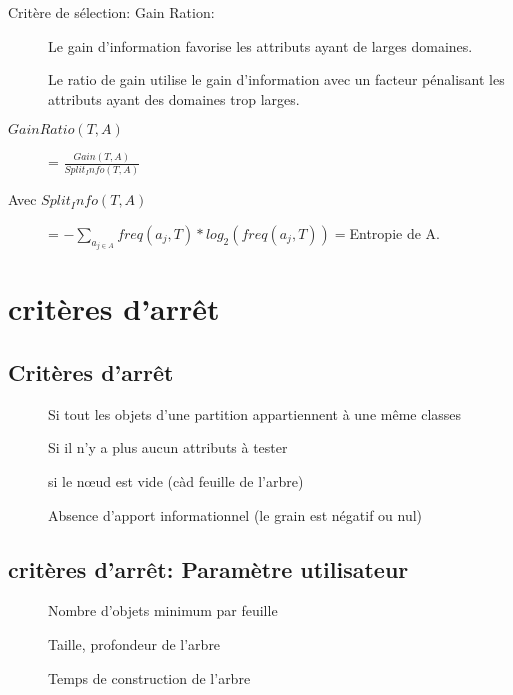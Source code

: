 Critère de sélection: Gain Ration:
\begin{description}
\item[] Le gain d’information favorise les attributs ayant de larges domaines.
\item[] Le ratio de gain utilise le gain d’information avec un facteur pénalisant les attributs ayant des domaines trop larges.
\item[$GainRatio(T,A)$] = $\frac{Gain(T,A)}{Split_Info(T,A)}$
\item[Avec $Split_Info(T,A)$] = $- \sum_{a_{j \in A}} freq(a_j,T)*log_2(freq(a_j,T)) = $Entropie de A.
\end{description}

\section{critères d'arrêt}

\subsection{Critères d'arrêt}
\begin{description}
\item[] Si tout les objets d'une partition appartiennent à une même classes
\item[] Si il n'y a plus aucun attributs à tester
\item[] si le nœud est vide (càd feuille de l'arbre)
\item[] Absence d'apport informationnel (le grain est négatif ou nul)
\end{description}

\subsection{critères d'arrêt: Paramètre utilisateur}
\begin{description}
\item[] Nombre d'objets minimum par feuille
\item[] Taille, profondeur de l'arbre
\item[] Temps de construction de l'arbre
\end{description}

